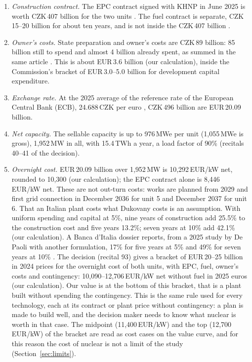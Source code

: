\begin{enumerate}\setlength\itemsep{1pt}
\item \emph{Construction contract.} The EPC contract signed with KHNP in June 2025 \citep{WNNDukovanySigned2025} is worth CZK\,407 billion for the two units \citep{CT24Dukovany}. The fuel contract is separate, CZK\,15--20 billion for about ten years, and is not inside the CZK\,407 billion \citep{ECDukovany2026,CT24Dukovany}.
\item \emph{Owner's costs.} State preparation and owner's costs are CZK\,89 billion: 85 billion still to spend and almost 4 billion already spent, as summed in the same article \citep{CT24Dukovany}. This is about EUR\,3.6 billion (our calculation), inside the Commission's bracket of EUR\,3.0--5.0 billion for development capital expenditure.
\item \emph{Exchange rate.} At the 2025 average of the reference rate of the European Central Bank (ECB), 24.688\,CZK per euro \citep{EurostatFX}, CZK\,496 billion are EUR\,20.09 billion.
\item \emph{Net capacity.} The sellable capacity is up to 976\,MWe per unit (1{,}055\,MWe is gross), 1{,}952\,MW in all, with 15.4\,TWh a year, a load factor of 90\% (recitals 40--41 of the decision).
\item \emph{Overnight cost.} EUR\,20.09 billion over 1{,}952\,MW is 10{,}292\,EUR/kW net, rounded to 10{,}300 (our calculation); the EPC contract alone is 8{,}446\,EUR/kW net. These are not out-turn costs: works are planned from 2029 and first grid connection in December 2036 for unit 5 and December 2037 for unit 6. That an Italian plant costs what Dukovany costs is an assumption. With uniform spending and capital at 5\%, nine years of construction add 25.5\% to the construction cost and five years 13.2\%; seven years at 10\% add 42.1\% (our calculation). A Banca d'Italia dossier reports, from a 2025 study by De Paoli with another formulation, 17\% for five years at 5\% and 49\% for seven years at 10\% \citep{QEBankitalia2025}. The decision (recital 93) gives a bracket of EUR\,20--25 billion in 2024 prices for the overnight cost of both units, with EPC, fuel, owner's costs and contingency: 10{,}090--12{,}706\,EUR/kW net without fuel in 2025 euros (our calculation). Our value is at the bottom of this bracket, that is a plant built without spending the contingency. This is the same rule used for every technology, each at its contract or plant price without contingency: a plan is made to build well, and the decision maker needs to know what nuclear is worth in that case. The midpoint (11{,}400\,EUR/kW) and the top (12{,}700\,EUR/kW) of the bracket are read as cost cases on the value curve, and for this reason the cost of nuclear is not a limit of the study (Section~\ref{sec:limits}).

\end{enumerate}
